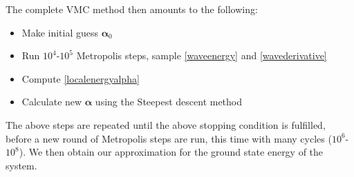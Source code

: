 \documentclass[english, a4paper]{article}
\begin{document}
The complete VMC method then amounts to the following:
\begin{itemize}
 \item Make initial guess $\boldsymbol{\alpha}_0$
 \item Run $10^4$-$10^5$ Metropolis steps, sample \eqref{waveenergy} and \eqref{wavederivative}
 \item Compute \eqref{localenergyalpha} 
 \item Calculate new $\boldsymbol{\alpha}$ using the Steepest descent method
\end{itemize}
The above steps are repeated until the above stopping condition is fulfilled, before a new round of
Metropolis steps are run, this time with many cycles ($10^6$-$10^8$). We then obtain our approximation
for the ground state energy of the system.\\
\end{document}
